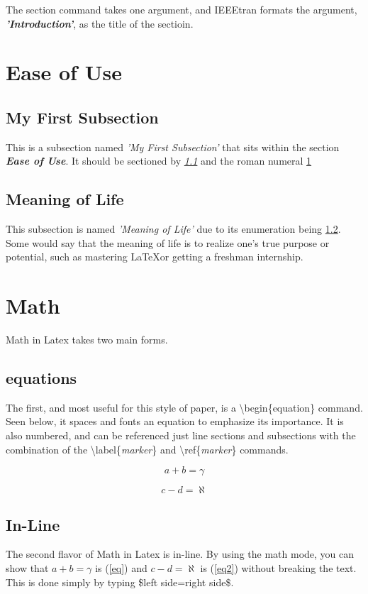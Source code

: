 \documentclass[conference]{IEEEtran}
\begin{document}
The section command takes one argument, and IEEEtran formats the argument, \textbf{\textit{'Introduction'}}, as the title of the sectioin.

\section{Ease of Use}\label{Ease}

\subsection{My First Subsection}\label{first}
This is a subsection named \textit{'My First Subsection'} that sits within the section \textbf{\textit{Ease of Use}}. It should be sectioned by \textit{\ref{first}} and the roman numeral \ref{Ease}

\subsection{Meaning of Life}\label{meaning}
This subsection is named \textit{'Meaning of Life'} due to its enumeration being \ref{meaning}. Some would say that the meaning of life is to realize one's true purpose or potential, such as mastering \LaTeX or getting a freshman internship.

\section{Math}
Math in Latex takes two main forms. 

\subsection{equations}
The first, and most useful for this style of paper, is a \textbackslash begin\{equation\} command. Seen below, it spaces and fonts an equation to emphasize its importance. It is also numbered, and can be referenced just line sections and subsections with the combination of the \textbackslash label\{\textit{marker}\} and \textbackslash ref\{\textit{marker}\} commands.

\begin{equation}
a+b=\gamma\label{eq}
\end{equation}

\begin{equation}
c-d=\aleph\label{eq2}
\end{equation}

\subsection{In-Line}
The second flavor of Math in Latex is in-line. By using the math mode, you can show that $a+b=\gamma$ is (\ref{eq}) and $c-d=\aleph$ is (\ref{eq2}) without breaking the text. This is done simply by typing \$left side=right side\$.
\end{document}
